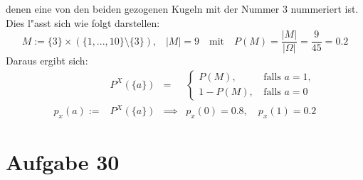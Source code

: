 \documentclass[10pt, oneside]{article}
\begin{document}
\begin{enumerate}[(a)]
        denen eine von den beiden gezogenen Kugeln mit der Nummer 3 nummeriert
        ist. Dies l"asst sich wie folgt darstellen:
        \begin{equation*}
            M := \{3\} \times (\{1,...,10\} \setminus \{3\})\text{,} \quad |M| = 9 \quad \text{mit} \quad P(M) = \dfrac{|M|}{|\Omega|} = \dfrac{9}{45} = 0.2
        \end{equation*}
        Daraus ergibt sich:
        \begin{equation*}
            \begin{array}{rccl}
                &P^X(\{a\}) &=& \begin{cases}
                    P(M)\text{,}& \text{ falls } a = 1, \\
                    1 - P(M)\text{,}& \text{ falls } a = 0
                \end{cases} \\[20pt]
                p_x(a) := &P^X(\{a\}) &\implies& p_x(0) = 0.8, \quad p_x(1) = 0.2
            \end{array}
        \end{equation*}
\end{enumerate}

\pagebreak
\section{Aufgabe 30}
\end{document}
